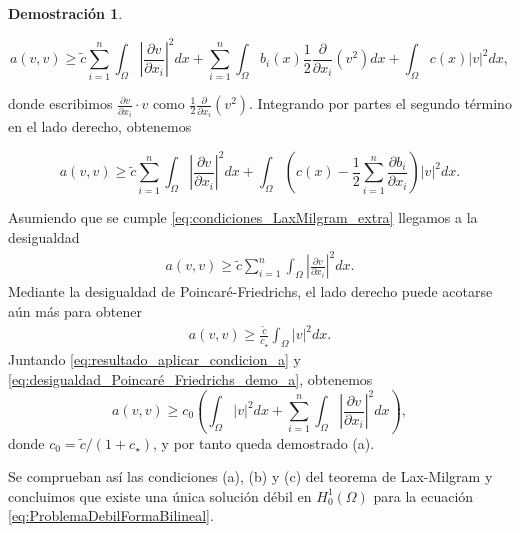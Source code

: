 \documentclass[a4paper,11pt,spanish, twoside, leqno]{tfg-uam}
\theoremstyle{definition}
\newtheorem{dem}[teor]{Demostración}
\begin{document}
\begin{dem}
\begin{itemize}
        \begin{equation*}
        a(v, v) \geq \tilde{c} \sum_{i=1}^n \int_\Omega \left| \frac{\partial v}{\partial x_i} \right|^2 dx
        + \sum_{i=1}^n \int_\Omega b_i(x) \frac{1}{2} \frac{\partial}{\partial x_i} (v^2) dx
        + \int_\Omega c(x) |v|^2 dx,
        \end{equation*}

        donde escribimos $\frac{\partial v}{\partial x_i} \cdot v$ como $\frac{1}{2} \frac{\partial}{\partial x_i}(v^2)$. Integrando por partes el segundo término en el lado derecho, obtenemos

        \begin{equation*}
        a(v, v) \geq \tilde{c} \sum_{i=1}^n \int_\Omega \left| \frac{\partial v}{\partial x_i} \right|^2 dx
        + \int_\Omega \left( c(x) - \frac{1}{2} \sum_{i=1}^n \frac{\partial b_i}{\partial x_i} \right) |v|^2 dx.
        \end{equation*}

        Asumiendo que se cumple \eqref{eq:condiciones_LaxMilgram_extra} llegamos a la desigualdad 
        \begin{align}\label{eq:resultado_aplicar_condicion_a}
        a(v, v) \geq  \tilde{c} \sum_{i=1}^{n} \int_{\Omega} \left| \frac{\partial v}{\partial x_i} \right|^2 dx.
        \end{align}
        Mediante la desigualdad de Poincaré-Friedrichs, el lado derecho puede acotarse aún más para obtener
        \begin{align}\label{eq:desigualdad_Poincaré_Friedrichs_demo_a}
        a(v, v) \geq \frac{\tilde{c}}{c_{\star}} \int_{\Omega} |v|^2 dx.
        \end{align}
        Juntando \eqref{eq:resultado_aplicar_condicion_a} y \eqref{eq:desigualdad_Poincaré_Friedrichs_demo_a}, obtenemos
        \begin{equation}\label{eq:desigualdad_final_demo_a}
        a(v, v) \geq c_0 \left( \int_{\Omega} |v|^2 dx + \sum_{i=1}^{n} \int_{\Omega} \left| \frac{\partial v}{\partial x_i} \right|^2 dx \right),
        \end{equation}
        donde $c_0 = \tilde{c}/(1 + c_{\star})$, y por tanto queda demostrado (a).
    \end{itemize}
    Se comprueban así las condiciones (a), (b) y (c) del teorema de Lax-Milgram y concluimos que existe una única solución débil en $H^1_0(\Omega)$ para la ecuación \eqref{eq:ProblemaDebilFormaBilineal}.
\end{dem}
\end{document}
